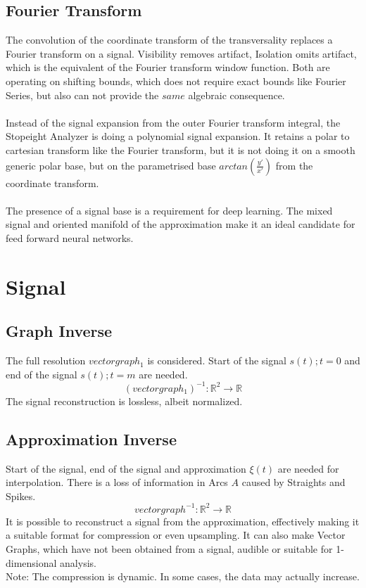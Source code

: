 \documentclass{report}
\begin{document}
\section{Fourier Transform}
The convolution of the coordinate transform of the transversality replaces a Fourier transform on a signal. Visibility removes artifact, Isolation omits artifact, which is the equivalent of the Fourier transform window function. Both are operating on shifting bounds, which does not require exact bounds like Fourier Series, but also can not provide the $same$ algebraic consequence.\\\\
Instead of the signal expansion from the outer Fourier transform integral, the Stopeight Analyzer is doing a polynomial signal expansion. It retains a polar to cartesian transform like the Fourier transform, but it is not doing it on a smooth generic polar base, but on the parametrised base $arctan(\frac{y'}{x'})$ from the coordinate transform.\\\\
The presence of a signal base is a requirement for deep learning. The mixed signal and oriented manifold of the approximation make it an ideal candidate for feed forward neural networks.

\chapter{Signal}
\section{Graph Inverse}
The full resolution $vectorgraph_{1}$ is considered. Start of the signal $s(t);t=0$ and end of the signal $s(t);t=m$ are needed.
\begin{equation}
(vectorgraph_{1})^{-1}: \mathbb{R}^2 \rightarrow \mathbb{R}
\end{equation}
The signal reconstruction is lossless, albeit normalized.
\section{Approximation Inverse}
Start of the signal, end of the signal and approximation $\xi(t)$ are needed for interpolation. There is a loss of information in Arcs $A$ caused by Straights and Spikes.
\begin{equation}
vectorgraph^{-1}: \mathbb{R}^2 \rightarrow \mathbb{R}
\end{equation}
It is possible to reconstruct a signal from the approximation, effectively making it a suitable format for compression or even upsampling. It can also make Vector Graphs, which have not been obtained from a signal, audible or suitable for 1-dimensional analysis.\\
Note: The compression is dynamic. In some cases, the data may actually increase.
\end{document}
